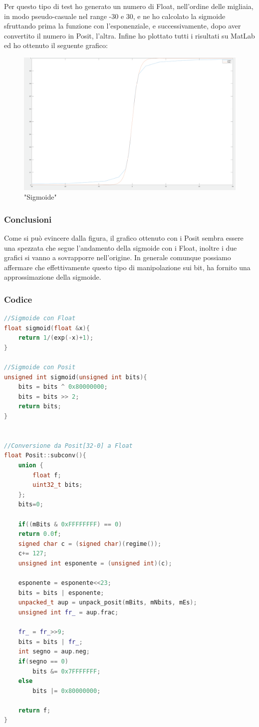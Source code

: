 \documentclass[a4paper,11pt]{article}
\begin{document}
Per questo tipo di test ho generato un numero di Float, nell'ordine delle migliaia, in modo pseudo-casuale nel range -30 e 30, e ne ho calcolato la sigmoide sfruttando prima la funzione con l'esponenziale, e successivamente, dopo aver convertito il numero in Posit, l'altra.
Infine ho plottato tutti i risultati su MatLab ed ho ottenuto il seguente grafico:

\begin{figure}[h]
	\includegraphics[scale=0.15]{sigmoide_2}
	\centering
	\caption{"Sigmoide"}
\end{figure}

\subsubsection{Conclusioni}
Come si può evincere dalla figura, il grafico ottenuto con i  Posit sembra essere una spezzata che segue l'andamento della sigmoide con i Float, inoltre i due grafici si vanno a sovrapporre nell'origine. In generale comunque possiamo affermare che effettivamente questo tipo di manipolazione sui bit, ha fornito una approssimazione della sigmoide.

\subsubsection{Codice}

\begin{lstlisting}[language=C++]
//Sigmoide con Float
float sigmoid(float &x){
	return 1/(exp(-x)+1);
}

//Sigmoide con Posit
unsigned int sigmoid(unsigned int bits){
	bits = bits ^ 0x80000000;
	bits = bits >> 2;
	return bits;
}


//Conversione da Posit[32-0] a Float
float Posit::subconv(){
	union {
		float f;
		uint32_t bits;
	};
	bits=0;
	
	if((mBits & 0xFFFFFFFF) == 0)
	return 0.0f;
	signed char c = (signed char)(regime());
	c+= 127;
	unsigned int esponente = (unsigned int)(c);	
	
	esponente = esponente<<23;
	bits = bits | esponente;
	unpacked_t aup = unpack_posit(mBits, mNbits, mEs);
	unsigned int fr_ = aup.frac;
	
	fr_ = fr_>>9;
	bits = bits | fr_;
	int segno = aup.neg;
	if(segno == 0)
		bits &= 0x7FFFFFFF;
	else
		bits |= 0x80000000;
	
	return f;
}
\end{lstlisting}
\newpage
\end{document}
